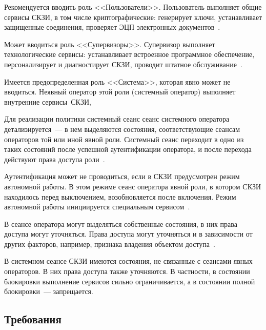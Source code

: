 Рекомендуется вводить роль <<Пользователи>>. Пользователь выполняет общие
сервисы СКЗИ, в том числе криптографические: генерирует ключи, устанавливает
защищенные соединения, проверяет ЭЦП электронных 
документов~.

Может вводиться роль <<Супервизоры>>. 
Супервизор выполняет технологические сервисы: 
устанавливает встроенное программное обеспечение,
персонализирует и диагностирует СКЗИ, проводит штатное 
обслуживание~.

Имеется предопределенная роль <<Система>>, которая явно может не вводиться.
%
Неявный оператор этой роли (системный оператор)  выполняет внутренние сервисы~СКЗИ, 
%

Для реализации политики  системный сеанс 
\addendum{(}сеанс системного оператора\addendum{)} детализируется~--- в нем 
выделяются состояния, соответствующие сеансам операторов той или иной явной 
роли. 
%
Системный сеанс переходит в одно из таких состояний после успешной 
аутентификации оператора, и после перехода действуют права доступа 
роли~. 

Аутентификация может не проводиться, если в СКЗИ предусмотрен 
режим автономной работы. В этом режиме сеанс оператора явной роли,
в котором СКЗИ находилось перед выключением, возобновляется после включения. 
Режим автономной работы инициируется специальным сервисом~. 

В сеансе оператора могут выделяться собственные состояния, в них права  
доступа могут уточняться. 
%
Права доступа могут уточняться и в зависимости от других факторов,
например, признака владения объектом доступа~.

В системном сеансе СКЗИ имеются состояния, не связанные с сеансами явных 
операторов. В них права доступа также уточняются. 
%
В частности, в состоянии блокировки выполнение сервисов 
сильно ограничивается, а в состоянии полной блокировки~--- запрещается. 

\subsection{Требования}\label{AC.Reqs}

